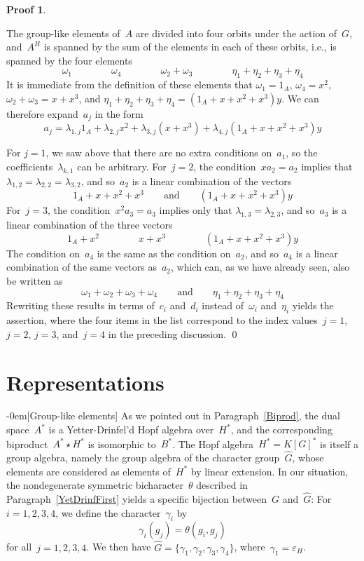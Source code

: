 \documentclass{article}
\makeatletter
\renewcommand{\subsection}{\@startsection{subsection}{2}{0em}%
{\baselineskip}{-0em}{\bfseries\normalsize}}
\newcounter{num}
\newenvironment{pflist}{\begin{list}{(\arabic{num})}{\usecounter{num} \leftmargin0cm \itemindent5pt}}{\end{list}}
\newcounter{num1}
\numberwithin{equation}{section}
\theoremstyle{definition}
\newtheorem*{pf}{Proof}
\theoremstyle{break}
\newcommand{\1}{{(1)}}
\newcommand{\2}{{(2)}}
\newcommand{\3}{{(3)}}
\newcommand{\eh}{{\varepsilon_{H}}}
\newcommand{\A}{1_A}
\makeatother
\begin{document}
\begin{pf}
\begin{pflist}
\item
The group-like elements of~$A$ are divided into four orbits under the action of~$G$, and~$A^H$ is spanned by the sum of the elements in each of these orbits, i.e., is spanned by the four elements
\[\omega_1 \qquad \qquad \omega_4 \qquad \qquad \omega_2 + \omega_3 \qquad  \qquad
\eta_1 + \eta_2 + \eta_3 + \eta_4  \]
It is immediate from the definition of these elements that $\omega_1 = \A$,
\mbox{$\omega_4 = x^2$}, \mbox{$\omega_2 + \omega_3 = x + x^3$}, and
$\eta_1 + \eta_2 + \eta_3 + \eta_4 = (\A + x + x^2 + x^3) y$. We can therefore expand~$a_j$ in the form
\[a_{j} = \lambda_{1,j} \A + \lambda_{2,j} x^2 + \lambda_{3,j} (x + x^3)
+ \lambda_{4,j} (\A + x + x^2 + x^3) y\]

For $j=1$, we saw above that there are no extra conditions on~$a_1$, so the coefficients~$\lambda_{k,1}$ can be arbitrary.
For~$j=2$, the condition~$x a_2 = a_2$ implies that
$\lambda_{1,2} = \lambda_{2,2} = \lambda_{3,2}$, and so~$a_2$ is a linear combination of the vectors
\[\A + x + x^2 + x^3 \qquad \text{and} \qquad (\A + x + x^2 +x^3) y\]
For~$j=3$, the condition~$x^2 a_3 = a_3$ implies only that
$\lambda_{1,3} = \lambda_{2,3}$, and so~$a_3$ is a linear combination of the three vectors
\[\A + x^2 \qquad \qquad x + x^3 \qquad \qquad (\A + x + x^2 +x^3) y\]
The condition on~$a_4$ is the same as the condition on~$a_2$, and so~$a_4$ is a linear combination of the same vectors as~$a_2$, which can, as we have already seen, also be written as
\[\omega_1 + \omega_2 + \omega_3 + \omega_4 \qquad \text{and} \qquad
\eta_1 + \eta_2 + \eta_3 + \eta_4\]
Rewriting these results in terms of~$c_i$ and~$d_i$ instead of~$\omega_i$ and~$\eta_i$ yields the assertion, where the four items in the list correspond to the index values~$j=1$, $j=2$, $j=3$, and~$j=4$ in the preceding discussion.
\qed
\end{pflist}
\end{pf}


\section{Representations} \label{Sec:Rep}
\subsection[Group-like elements]{} \label{Group}
As we pointed out in Paragraph~\ref{Biprod}, the dual space~$A^*$ is a Yetter-Drinfel'd Hopf algebra over~$H^*$, and the corresponding biproduct~$A^*\star H^*$ is isomorphic to~$B^*$. The Hopf
algebra~$H^* = K[G]^*$ is itself a group algebra, namely the group algebra of the character group~$\hat{G}$, whose elements are considered as elements of~$H^*$ by linear extension. In our situation, the nondegenerate symmetric bicharacter~$\theta$ described in Paragraph~\ref{YetDrinfFirst} yields a specific bijection between~$G$ and~$\hat{G}$: For~$i=1, 2, 3, 4$, we define the character~$\gamma_i$ by
\[\gamma_i(g_j) = \theta (g_i, g_j)\]
for all~$j=1, 2, 3, 4$. We then have
$\hat{G} = \{\gamma_1, \gamma_2, \gamma_3, \gamma_4\}$, where~$\gamma_1 = \eh$.
\end{document}
